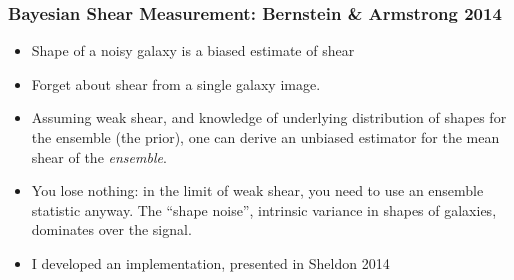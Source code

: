 \documentclass{beamer}
\begin{document}
\frame
{
    \frametitle{Bayesian Shear Measurement: Bernstein \& Armstrong 2014}

    \begin{itemize}

        \item Shape of a noisy galaxy is a biased estimate of shear

        \item Forget about shear from a single galaxy image.


         \item Assuming weak shear, and knowledge of underlying distribution of
             shapes for the ensemble (the prior), one can derive an unbiased
             estimator for the mean shear of the {\it ensemble}.

         \item You lose nothing: in the limit of weak shear, you need
             to use an ensemble statistic anyway.  The ``shape noise'',
             intrinsic variance in shapes of galaxies, dominates over
             the signal.

        \item I developed an implementation, presented in Sheldon 2014
         
    \end{itemize}

}
\end{document}
